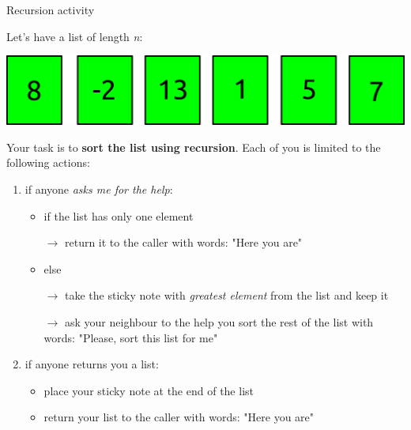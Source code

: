 \documentclass[10pt]{beamer}
\begin{document}
\begin{frame}{Recursion activity}

Let's have a list of length \emph{n}:

\begin{center}
\includegraphics[width=\textwidth]{frames_example.png}
\end{center}

Your task is to \textbf{sort the list using recursion}. Each of you is limited to the following actions:

\begin{enumerate}
\item if anyone \emph{asks me for the help}:
\begin{itemize}
	\item if the list has only one element

	$\rightarrow$ return it to the caller with words: "Here you are"

	\item else

	$\rightarrow$ take the sticky note with \emph{greatest element} from the list and keep it

	$\rightarrow$ ask your neighbour to the help you sort the rest of the list with words: "Please, sort this list for me"
\end{itemize}
\item if anyone returns you a list:
\begin{itemize}
	\item place your sticky note at the end of the list
	\item return your list to the caller with words: "Here you are"
\end{itemize}
\end{enumerate}

\end{frame}
\end{document}
